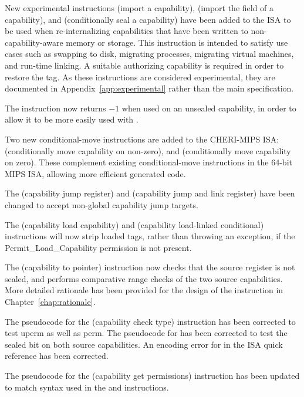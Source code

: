 \begin{description}
  New experimental instructions  (import a capability),
   (import the \cotype{} field of a capability), and
   (conditionally seal a capability) have been added
  to the ISA to be used when re-internalizing capabilities that have been
  written to non-capability-aware memory or storage.
  This instruction is intended to satisfy use cases such as swapping to
  disk, migrating processes, migrating virtual machines, and run-time linking.
  A suitable authorizing capability is required in order to restore the
  tag.
  As these instructions are considered experimental, they are documented in
  Appendix~\ref{app:experimental} rather than the main specification.

  The  instruction now returns $-1$ when used on an
  unsealed capability, in order to allow it to be more easily used with
  .

  Two new conditional-move instructions are added to the CHERI-MIPS ISA:
   (conditionally move capability on non-zero), and
   (conditionally move capability on zero).
  These complement existing conditional-move instructions in the 64-bit MIPS
  ISA, allowing more efficient generated code.

  The  (capability jump register) and 
  (capability jump and link register) have been changed to accept non-global
  capability jump targets.

  The  (capability load capability) and 
  (capability load-linked conditional) instructions will now strip loaded tags,
  rather than throwing an exception, if the Permit\_Load\_Capability permission
  is not present.

  The  (capability to pointer) instruction now checks that
  the source register is not sealed, and performs comparative range checks of
  the two source capabilities.
  More detailed rationale has been provided for the design of the
   instruction in Chapter~\ref{chap:rationale}.

  The pseudocode for the  (capability check
  type) instruction has been corrected to test uperm as well as perm.
  The pseudocode for  has been corrected to test the
  sealed bit on both source capabilities.
  An encoding error for  in the ISA quick reference has
  been corrected.

  The pseudocode for the  (capability get permissions)
  instruction has been updated to match syntax used in the
   and  instructions.


\end{description}
